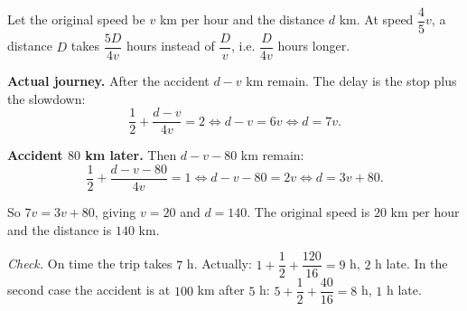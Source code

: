 Let the original speed be $v$ km per hour and the distance $d$ km. At speed $\dfrac45v$, a distance $D$ takes $\dfrac{5D}{4v}$ hours instead of $\dfrac Dv$, i.e. $\dfrac{D}{4v}$ hours longer.

\textbf{Actual journey.} After the accident $d-v$ km remain. The delay is the stop plus the slowdown:
\[\dfrac12+\dfrac{d-v}{4v}=2\iff d-v=6v\iff d=7v.\]

\textbf{Accident $80$ km later.} Then $d-v-80$ km remain:
\[\dfrac12+\dfrac{d-v-80}{4v}=1\iff d-v-80=2v\iff d=3v+80.\]

So $7v=3v+80$, giving $v=20$ and $d=140$. The original speed is $\boxed{20\text{ km per hour}}$ and the distance is $\boxed{140\text{ km}}$.

\emph{Check.} On time the trip takes $7$ h. Actually: $1+\dfrac12+\dfrac{120}{16}=9$ h, $2$ h late. In the second case the accident is at $100$ km after $5$ h: $5+\dfrac12+\dfrac{40}{16}=8$ h, $1$ h late.
